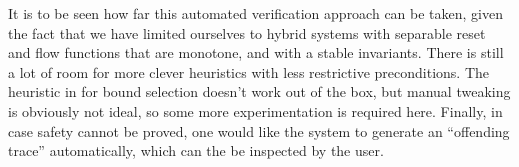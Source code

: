 \documentclass[runningheads]{llncs}
\begin{document}
It is to be seen how far this automated verification approach can be
taken, given the fact that we have limited ourselves to hybrid systems
with separable reset and flow functions that are monotone, and with a
stable invariants. There is still a lot of room for more clever
heuristics with less restrictive preconditions. The heuristic in
\cite{alur} for bound selection doesn't work out of the box, but
manual tweaking is obviously not ideal, so some more experimentation
is required here. Finally, in case safety cannot be proved, one would
like the system to generate an ``offending trace'' automatically,
which can the be inspected by the user.

%


\end{document}
